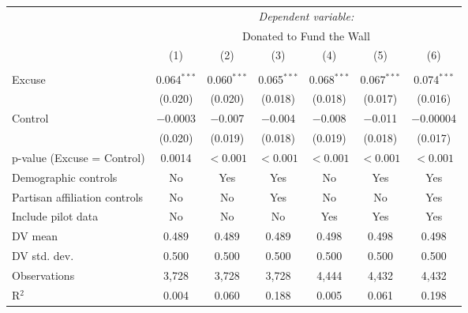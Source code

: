 
\begin{table}[!htbp] \centering 
  \label{t:2-main} 
\begin{threeparttable}
\begin{tabular}{@{\hspace{5pt}}l@{\hspace{5pt}}cccccc} 
\toprule 
 & \multicolumn{6}{c}{\textit{Dependent variable:}} \\ 
\cmidrule(rr){2-7} 
 & \multicolumn{6}{c}{Donated to Fund the Wall} \\ 
 \cmidrule(rr){2-7}
 & (1) & (2) & (3) & (4) & (5) & (6)\\ 
\midrule  
\\[-2.1ex] Excuse & 0.064$^{***}$ & 0.060$^{***}$ & 0.065$^{***}$ & 0.068$^{***}$ & 0.067$^{***}$ & 0.074$^{***}$ \\ 
  & (0.020) & (0.020) & (0.018) & (0.018) & (0.017) & (0.016) \\ 
 \addlinespace 
 Control & $-$0.0003 & $-$0.007 & $-$0.004 & $-$0.008 & $-$0.011 & $-$0.00004 \\ 
  & (0.020) & (0.019) & (0.018) & (0.019) & (0.018) & (0.017) \\ 
 \addlinespace 
p-value (Excuse = Control) & 0.0014 & $<0.001$ & $<0.001$ & $<0.001$ & $<0.001$ & $<0.001$ \\ 
\midrule  
Demographic controls & No & Yes & Yes & No & Yes & Yes \\ 
Partisan affiliation controls & No & No & Yes & No & No & Yes \\ 
\midrule
Include pilot data & No & No & No & Yes & Yes & Yes \\
\addlinespace
DV mean & 0.489 & 0.489 & 0.489 & 0.498 & 0.498 & 0.498 \\
DV std. dev. & 0.500 & 0.500 & 0.500 & 0.500 & 0.500 & 0.500 \\
Observations & 3,728 & 3,728 & 3,728 & 4,444 & 4,432 & 4,432 \\ 
R$^{2}$ & 0.004 & 0.060 & 0.188 & 0.005 & 0.061 & 0.198 \\ 
\bottomrule 
\end{tabular} 
\end{threeparttable}
\end{table} 
